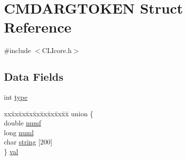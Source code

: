 \hypertarget{structCMDARGTOKEN}{\section{C\+M\+D\+A\+R\+G\+T\+O\+K\+E\+N Struct Reference}
\label{structCMDARGTOKEN}
}


{\ttfamily \#include $<$C\+L\+Icore.\+h$>$}

\subsection*{Data Fields}
\begin{DoxyCompactItemize}
\item 
int \hyperlink{structCMDARGTOKEN_a268f75c3a394c9466df7aba70dc76c00}{type}
\item 
\begin{tabbing}
xx\=xx\=xx\=xx\=xx\=xx\=xx\=xx\=xx\=\kill
union \{\\
\>double \hyperlink{structCMDARGTOKEN_a8f29c19d721dbe26248fc92c01c0e497}{numf}\\
\>long \hyperlink{structCMDARGTOKEN_a8ef8bd8dde032f117c7c316dee08a7c9}{numl}\\
\>char \hyperlink{structCMDARGTOKEN_ac74ef24422dc07823178ebbe43b7ad10}{string} \mbox{[}200\mbox{]}\\
\} \hyperlink{structCMDARGTOKEN_a96839ddcbefc8d1629d9be94a1319bc3}{val}\\

\end{tabbing}\end{DoxyCompactItemize}


